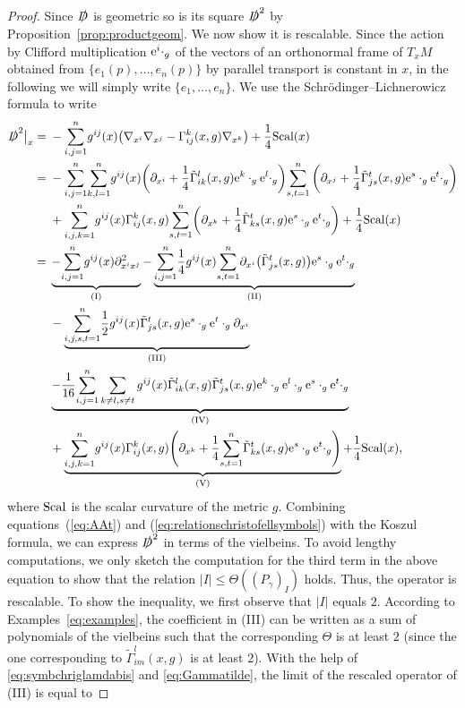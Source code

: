 \documentclass[10pt,a4paper]{amsart}
\numberwithin{equation}{section}
\theoremstyle{definition}
\begin{document}
\begin{proof} Since $\slashed D$ is geometric so is its square $\slashed D^2$ by Proposition~\ref{prop:productgeom}. We now show it is rescalable. Since the action by Clifford multiplication ${\rm e}^i\cdot_g$ of the vectors of an orthonormal frame of $T_xM$ obtained from $\{e_1(p),\dots,e_n(p)\}$ by parallel transport is constant in $x$, in the following we will simply write $\{e_1 ,\dots,e_n \}$. We use the Schr\"odinger--Lichnerowicz formula \cite{LM} to write
 \begin{align*}
 \slashed 	D^2\big|_x={}&-{\sum_{i,j=1}^n}g^{ij}(x)\bigl(\nabla_{x^i}\nabla_{x^j}-\Gamma_{ij}^k(x, g)\nabla_{x^k}\bigr)+\frac{1}{4}{\rm Scal}(x)\\
 ={}&-{\sum_{i,j=1}^n}{\sum_{k,l=1}^n}g^{ij}(x)\biggl(\partial_{x^i}+\frac{1}{4}\tilde\Gamma_{i k}^l(x,g) {\rm e}^k\cdot_g {\rm e}^l\cdot_g\biggr) {\sum_{s,t=1}^n}\left(\partial_{x^j}+\frac{1}{4}\tilde\Gamma_{j s}^{t}(x,g) {\rm e}^{s}\cdot_g {\rm e}^{t}\cdot_g\right)\\
 &{} +{\sum_{i,j, k=1}^n} g^{ij}(x)\Gamma_{ij}^k(x,g){\sum_{s,t=1}^n}\biggl(\partial_{x^k}+\frac{1}{4}\tilde\Gamma_{k s}^{t}(x, g){\rm e}^s\cdot_g {\rm e}^t\cdot_g\biggr)+\frac{1}{4}{\rm Scal}(x)\\
 ={}&\underbrace{-{\sum_{i,j=1}^n}g^{ij}(x)\partial^2_{x^i x^j}}_{\rm (I)}-\underbrace{{\sum_{i,j=1}^n}\frac{1}{4}g^{ij}(x){\sum_{s, t=1}^n}\partial_{x^i}\bigl(\tilde\Gamma_{j s}^{t}(x,g)\bigr){\rm e}^s\cdot_g {\rm e}^{t}\cdot_g}_{\rm (II)}\\
 &{}-\underbrace{{\sum_{i,j, s,t=1}^n}\frac{1}{2}g^{ij}(x)\tilde\Gamma_{js}^{t}(x,g) {\rm e}^{s}\cdot_g {\rm e}^{t}\cdot_g\partial_{x^i}}_{\rm (III)}\\
 &{} \underbrace{-\frac{1}{16}{\sum_{i,j=1}^n}\sum_{k\neq l, s\neq t} g^{ij}(x)\tilde\Gamma_{i k}^l(x,g)\tilde\Gamma_{j s}^{t}(x,g){\rm e}^k\cdot_g {\rm e}^l\cdot_g {\rm e}^{s}\cdot_g {\rm e}^{t}\cdot_g}_{\rm (IV)}\\
 &{}+\underbrace{{\sum_{i,j, k=1}^n}g^{ij}(x)\Gamma_{ij}^k(x,g)\Biggl(\partial_{x^k}+\frac{1}{4}{\sum_{s,t=1}^n}\tilde\Gamma_{k s}^{t}(x, g){\rm e}^s\cdot_g {\rm e}^t\cdot_g\Biggr)}_{\rm (V)}+\frac{1}{4}{\rm Scal}(x),
 \end{align*}
 where ${\rm Scal}$ is the scalar curvature of the metric $g$. Combining equations~(\ref{eq:AAt}) and (\ref{eq:relationschristofellsymbols}) with the Koszul formula, we can express $\slashed D^2$ in terms of the vielbeins. To avoid lengthy computations, we only sketch the computation for the third term in the above equation to show that the relation $|I|\leq \Theta(({P_\gamma})_I)$ holds. Thus, the operator is rescalable. To show the inequality, we first observe that $|I|$ equals $2$. According to Examples~\ref{eq:examples}, the coefficient in (III) can be written as a sum of polynomials of the vielbeins such that the corresponding $\Theta$ is at least $2$ \big(since the one corresponding to $\tilde{\Gamma}_{i m}^l(x,g)$ is at least $2$\big). With the help of \eqref{eq:symbchriglamdabis} and \eqref{eq:Gammatilde}, the limit of the rescaled operator of (III) is equal to

\end{proof}
\end{document}
